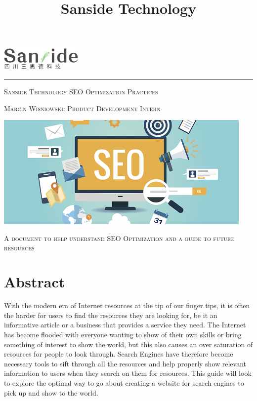 \documentclass{article}
\begin{document}
\title{Sanside Technology}
\begin{titlepage}
    \includegraphics[width = 150px]{images/SansideLogo.png}
    \hfill
    \hrule
    \vspace{2cm}
    \centering
	{\scshape\LARGE Sanside Technology SEO Optimization Practices\par}
	\vspace{0.5cm}
	{\scshape Marcin Wisniowski: Product Development Intern \par}
    \vspace{2cm}
    \begin{center}
    \includegraphics[width = 475px]{images/SEO.png}
    \end{center}
    \vspace{0.5cm}
    {\scshape A document to help understand SEO Optimization and a guide to future resources}
\end{titlepage}

\section{Abstract}
With the modern era of Internet resources at the tip of our finger tips, it is often the harder for users to find the resources they are looking for, be it an informative article or a business that provides a service they need. The Internet has become flooded with everyone wanting to show of their own skills or bring something of interest to show the world, but this also causes an over saturation of resources for people to look through. Search Engines have therefore become necessary tools to sift through all the resources and help properly show relevant information to users when they search on them for resources. This guide will look to explore the optimal way to go about creating a website for search engines to pick up and show to the world. 
\end{document}
